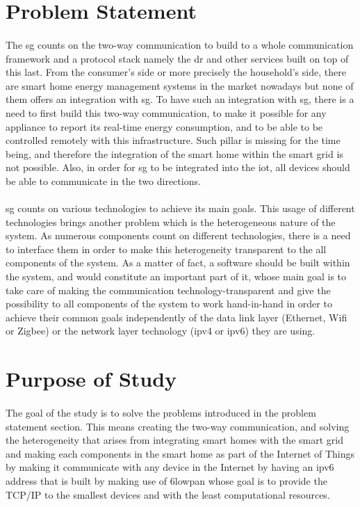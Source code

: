 \documentclass[oneside,12pt,a4paper,final]{book}
\begin{document}
\section{Problem Statement}
\paragraph{}
The  \gls{sg} counts on the two-way communication to build to a whole communication framework and a protocol stack namely the \gls{dr} and other services built on top of this last. From the consumer's side or more precisely the household's side, there are smart home energy management systems in the market nowadays but none of them offers an integration with \gls{sg}. To have such an integration with \gls{sg}, there is a need to first build this two-way communication, to make it possible for any appliance to report its real-time energy consumption, and to be able to be controlled remotely with this infrastructure. Such pillar is missing for the time being, and therefore the integration of the smart home within the smart grid is not possible. Also, in order for \gls{sg} to be integrated into the \gls{iot}, all devices should be able to communicate in the two directions.
\paragraph{}
\gls{sg} counts on various technologies to achieve its main goals. This usage of different technologies brings another problem which is the heterogeneous nature of the system. As numerous components count on different technologies, there is a need to interface them in order to make this heterogeneity transparent to the all components of the system. As a matter of fact, a software should be built within the system, and would constitute an important part of it, whose main goal is to take care of making the communication technology-transparent and give the possibility to all components of the system to work hand-in-hand in order to achieve their common goals independently of the data link layer (Ethernet, Wifi or Zigbee) or the network layer technology (\gls{ipv4} or \gls{ipv6}) they are using.

\section{Purpose of Study}
 \paragraph{}
The goal of the study is to solve the problems introduced in the problem statement section. This means creating the two-way communication, and solving the heterogeneity that arises from integrating smart homes with the smart grid and making each components in the smart home as part of the Internet of Things by making it communicate with any device in the Internet by having an \gls{ipv6} address that is built by making use of \gls{6lowpan} whose goal is to provide the TCP/IP to the smallest devices and with the least computational resources.
\end{document}

